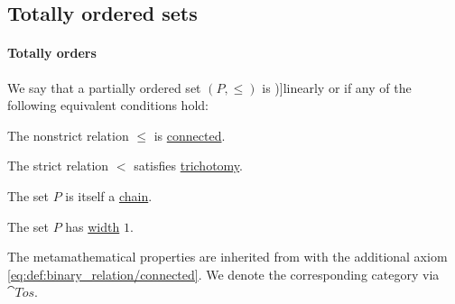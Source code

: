 \subsection{Totally ordered sets}\label{subsec:totally_ordered_sets}

\paragraph{Totally orders}

\begin{definition}\label{def:totally_ordered_set}
  We say that a partially ordered set \( (P, \leq) \) is \term[ru=линейно упорядоченое множество (\cite[def. 3.4]{Гуров2013})]{linearly} or  if any of the following equivalent conditions hold:
  \begin{thmenum}
     The nonstrict relation \( \leq \) is \hyperref[def:binary_relation/connected]{connected}.

     The strict relation \( < \) satisfies \hyperref[def:binary_relation/trichotomy]{trichotomy}.

     The set \( P \) is itself a \hyperref[def:partial_order_chain/chain]{chain}.

     The set \( P \) has \hyperref[def:partial_order_chain/width]{width} \( 1 \).
  \end{thmenum}
\end{definition}
\begin{comments}
  \item The metamathematical properties are inherited from  with the additional axiom \eqref{eq:def:binary_relation/connected}. We denote the corresponding category via \( \cat{Tos} \).
\end{comments}
